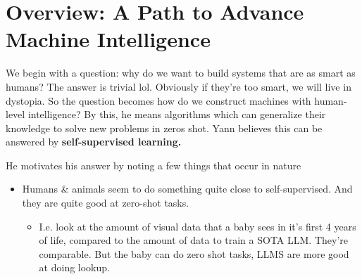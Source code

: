 \section{Overview: A Path to Advance Machine Intelligence}
We begin with a question: why do we want to build systems that are as smart as humans? The answer is trivial lol. Obviously if they're too smart, we will live in dystopia. So the question becomes how do we construct machines with human-level intelligence? By this, he means algorithms which can generalize their knowledge to solve new problems in zeros shot. Yann believes this can be answered by \textbf{self-supervised learning.} 

He motivates his answer by noting a few things that occur in nature
\begin{itemize}
	\item Humans \& animals seem to do something quite close to self-supervised. And they are quite good at zero-shot tasks.
	\begin{itemize}
		\item I.e. look at the amount of visual data that a baby sees in it's first 4 years of life, compared to the amount of data to train a SOTA LLM. They're comparable. But the baby can do zero shot tasks, LLMS are more good at doing lookup.
	\end{itemize}
\end{itemize}

